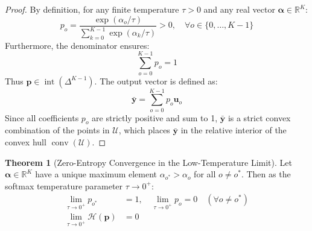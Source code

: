 \documentclass[11pt,a4paper]{article}
\theoremstyle{definition}
\newtheorem{theorem}{\textbf{Theorem}}[section]
\begin{document}
\begin{proof}
By definition, for any finite temperature $\tau > 0$ and any real vector $\boldsymbol{\alpha} \in \mathbb{R}^K$:
{\boldmath
\begin{equation}
p_o = \frac{\exp(\alpha_o / \tau)}{\sum_{k=0}^{K-1} \exp(\alpha_k / \tau)} > 0, \quad \forall o \in \{0, \dots, K-1\}
\end{equation}
}
Furthermore, the denominator ensures:
{\boldmath
\begin{equation}
\sum_{o=0}^{K-1} p_o = 1
\end{equation}
}
Thus $\mathbf{p} \in \operatorname{int}(\Delta^{K-1})$.
The output vector is defined as:
{\boldmath
\begin{equation}
\bar{\mathbf{y}} = \sum_{o=0}^{K-1} p_o \mathbf{u}_o
\end{equation}
}
Since all coefficients $p_o$ are strictly positive and sum to 1, $\bar{\mathbf{y}}$ is a strict convex combination of the points in $\mathcal{U}$, which places $\bar{\mathbf{y}}$ in the relative interior of the convex hull $\operatorname{conv}(\mathcal{U})$.
\end{proof}

\begin{theorem}[Zero-Entropy Convergence in the Low-Temperature Limit]
Let $\boldsymbol{\alpha} \in \mathbb{R}^K$ have a unique maximum element $\alpha_{o^*} > \alpha_o$ for all $o \neq o^*$. Then as the softmax temperature parameter $\tau \to 0^+$:
{\boldmath
\begin{align}
\lim_{\tau \to 0^+} p_{o^*} &= 1, \quad \lim_{\tau \to 0^+} p_o = 0 \quad (\forall o \neq o^*) \\
\lim_{\tau \to 0^+} \mathcal{H}(\mathbf{p}) &= 0
\end{align}
}
\end{theorem}
\end{document}
